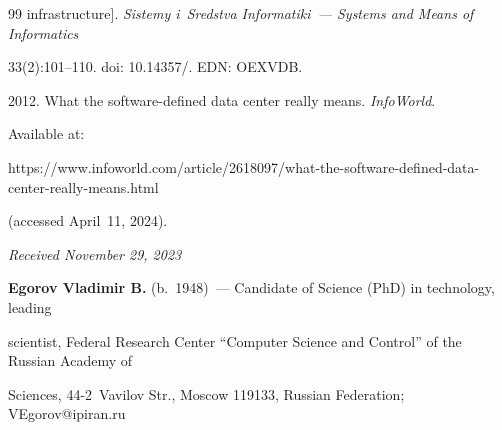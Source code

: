 {{\begin{thebibliography}{99}
infrastructure]. \textit{Sistemy i~Sredstva Informatiki~--- Systems and Means of Informatics} 


33(2):101--110. doi: 10.14357\!/. EDN: OEXVDB.




 2012. What the software-defined data center really means. \textit{InfoWorld}. 


Available at: {\sf  


https://www.infoworld.com/article/2618097/what-the-software-defined-data-center-really-means.html} 


(accessed April~11, 2024).





\end{thebibliography}


} }





\vspace*{-6pt}





\hfill{\small\textit{Received November 29, 2023}} 





\vspace*{-10pt} 





\Contrl





\vspace*{-3pt}





\noindent


\textbf{Egorov Vladimir B.} (b.\ 1948)~--- Candidate of Science (PhD) in technology, leading 


scientist, Federal Research Center ``Computer Science and Control'' of the Russian Academy of 


Sciences, 44-2~Vavilov Str., Moscow 119133, Russian Federation; \mbox{VEgorov@ipiran.ru}








\label{end\stat}





\renewcommand{\bibname}{\protect\rm Литература} 


